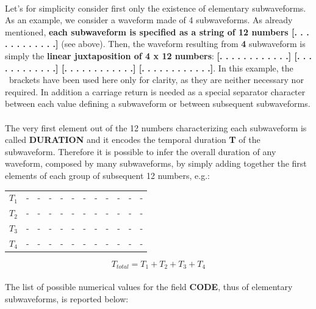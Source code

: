 \paragraph{}
Let's for simplicity consider first only the existence of elementary subwaveforms. As an example, we consider a waveform
made of 4 subwaveforms. As already mentioned, \textbf{each subwaveform is specified as a string of 12 numbers
[. . . . . . . . . . . .] }(see above). Then, the waveform resulting from \textbf{4} subwaveform is simply the
\textbf{linear juxtaposition of 4 x 12 numbers}: \textbf{[. . . . . . . . . . . .] [. . . . . . . . . . . .] [. . . . .
. . . . . . .] [. . . . . . . . . . . .]}. In this example, the \ brackets have been used here only for clarity, as
they are neither necessary nor required. In addition a carriage return is needed as a special separator character
between each value defining a subwaveform or between subsequent subwaveforms.

\paragraph{}
The very first element out of the 12 numbers characterizing each subwaveform is called \textbf{DURATION} and it encodes
the temporal duration \textbf{T} of the subwaveform. Therefore it is possible to infer the overall duration of any
waveform, composed by many subwaveforms, by simply adding together the first elements of each group of subsequent 12
numbers, e.g.:

\begin{center}
\begin{tabular}{rrrrrrrrrrrr}
$T_{1}$ & - & - & - & - & - & - & - & - & - & - & - \\
$T_{2}$ & - & - & - & - & - & - & - & - & - & - & - \\
$T_{3}$ & - & - & - & - & - & - & - & - & - & - & - \\
$T_{4}$ & - & - & - & - & - & - & - & - & - & - & - \\
\end{tabular}
$$T_{total}=T_1+T_2+T_3+T_4$$
\end{center}

\bigskip
	
\paragraph{}
The list of possible numerical values for the field \textbf{CODE}, thus of elementary subwaveforms, is reported below:

